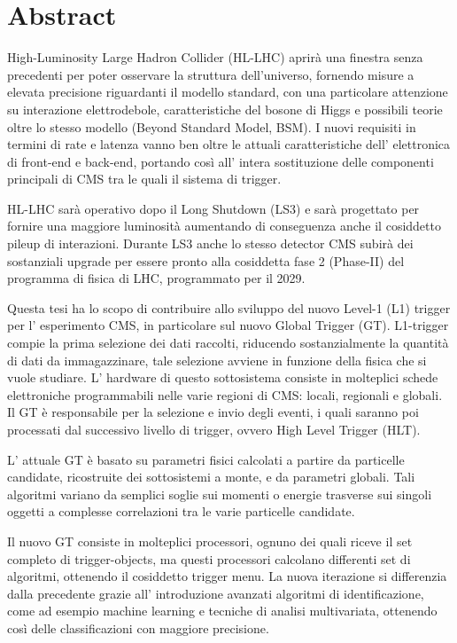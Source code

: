 \documentclass[../../main/main.tex]{subfiles}
\begin{document}
    \chapter{Abstract}
    
    \label{sec:Abstract}
    
    High-Luminosity Large Hadron Collider (HL-LHC) aprirà una finestra senza precedenti per poter osservare la struttura dell'universo, fornendo misure a elevata precisione riguardanti il modello standard, con una particolare attenzione su interazione elettrodebole, caratteristiche del bosone di Higgs e possibili teorie oltre lo stesso modello (Beyond Standard Model, BSM). I nuovi requisiti in termini di rate e latenza vanno ben oltre le attuali caratteristiche dell' elettronica di front-end e back-end, portando così all' intera sostituzione delle componenti principali di CMS tra le quali il sistema di trigger.  

    HL-LHC sarà operativo dopo il Long Shutdown (LS3) e sarà progettato per fornire una maggiore luminosità aumentando di conseguenza anche il cosiddetto pileup di interazioni. Durante LS3 anche lo stesso detector CMS subirà dei sostanziali upgrade per essere pronto alla cosiddetta fase 2 (Phase-II) del programma di fisica di LHC, programmato per il 2029.  
    
    Questa tesi ha lo scopo di contribuire allo sviluppo del nuovo Level-1 (L1) trigger per l' esperimento CMS, in particolare sul nuovo Global Trigger (GT). L1-trigger compie la prima selezione dei dati raccolti, riducendo sostanzialmente la quantità di dati da immagazzinare, tale selezione avviene in funzione della fisica che si vuole studiare. L' hardware di questo sottosistema consiste in molteplici schede elettroniche programmabili nelle varie regioni di CMS: locali, regionali e globali. Il GT è responsabile per la selezione e invio degli eventi, i quali saranno poi processati dal successivo livello di trigger, ovvero High Level Trigger (HLT).  
    
    L' attuale GT è basato su parametri fisici calcolati a partire da particelle candidate, ricostruite dei sottosistemi a monte, e da parametri globali. Tali algoritmi variano da semplici soglie sui momenti o energie trasverse sui singoli oggetti a complesse correlazioni tra le varie particelle candidate.  
    
    Il nuovo GT consiste in molteplici processori, ognuno dei quali riceve il set completo di trigger-objects, ma questi processori calcolano differenti set di algoritmi, ottenendo il cosiddetto trigger menu. La nuova iterazione si differenzia dalla precedente grazie all' introduzione avanzati algoritmi di identificazione, come ad esempio machine learning e tecniche di analisi multivariata, ottenendo così delle classificazioni con maggiore precisione.
    
\end{document}
